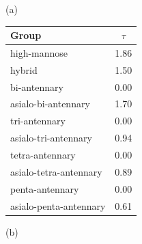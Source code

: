     \begin{table}
        \begin{minipage}[t]{0.25\linewidth}
            \vspace{0pt}
            (a)
            \centering
            
    \begin{tabular}{l | c}
        Group & $\tau$ \\
        \hline
        high-mannose & 1.86 \\
        hybrid & 1.50 \\
        bi-antennary & 0.00 \\
        asialo-bi-antennary & 1.70 \\
        tri-antennary & 0.00 \\
        asialo-tri-antennary & 0.94 \\
        tetra-antennary & 0.00 \\
        asialo-tetra-antennary & 0.89 \\
        penta-antennary & 0.00 \\
        asialo-penta-antennary & 0.61 \\
    \end{tabular}
    
            
        \end{minipage}
        \hspace{1cm}
        \begin{minipage}[t]{0.55\linewidth}
            \vspace{0pt}
            (b)
            \centering
            

\end{minipage}
\end{table}
